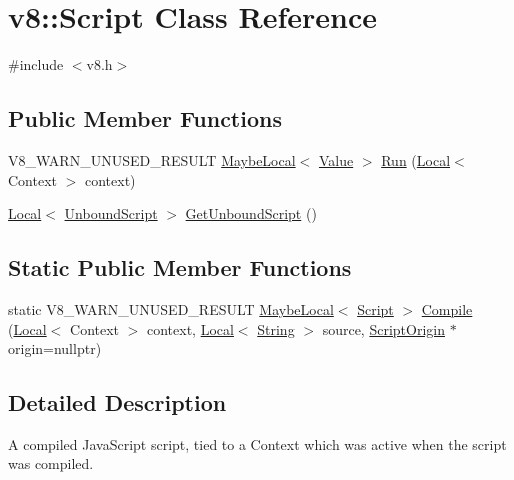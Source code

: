 \hypertarget{classv8_1_1Script}{}\section{v8\+:\+:Script Class Reference}
\label{classv8_1_1Script}


{\ttfamily \#include $<$v8.\+h$>$}

\subsection*{Public Member Functions}
\begin{DoxyCompactItemize}
\item 
V8\+\_\+\+W\+A\+R\+N\+\_\+\+U\+N\+U\+S\+E\+D\+\_\+\+R\+E\+S\+U\+LT \mbox{\hyperlink{classv8_1_1MaybeLocal}{Maybe\+Local}}$<$ \mbox{\hyperlink{classv8_1_1Value}{Value}} $>$ \mbox{\hyperlink{classv8_1_1Script_a73a556400c5f6a2a1460a933a815fbf9}{Run}} (\mbox{\hyperlink{classv8_1_1Local}{Local}}$<$ Context $>$ context)
\item 
\mbox{\hyperlink{classv8_1_1Local}{Local}}$<$ \mbox{\hyperlink{classv8_1_1UnboundScript}{Unbound\+Script}} $>$ \mbox{\hyperlink{classv8_1_1Script_a7f34b85c7687d933284e93e6e2593c14}{Get\+Unbound\+Script}} ()
\end{DoxyCompactItemize}
\subsection*{Static Public Member Functions}
\begin{DoxyCompactItemize}
\item 
static V8\+\_\+\+W\+A\+R\+N\+\_\+\+U\+N\+U\+S\+E\+D\+\_\+\+R\+E\+S\+U\+LT \mbox{\hyperlink{classv8_1_1MaybeLocal}{Maybe\+Local}}$<$ \mbox{\hyperlink{classv8_1_1Script}{Script}} $>$ \mbox{\hyperlink{classv8_1_1Script_acf5759f7f53b2a0eb57e835b32108452}{Compile}} (\mbox{\hyperlink{classv8_1_1Local}{Local}}$<$ Context $>$ context, \mbox{\hyperlink{classv8_1_1Local}{Local}}$<$ \mbox{\hyperlink{classv8_1_1String}{String}} $>$ source, \mbox{\hyperlink{classv8_1_1ScriptOrigin}{Script\+Origin}} $\ast$origin=nullptr)
\end{DoxyCompactItemize}


\subsection{Detailed Description}
A compiled Java\+Script script, tied to a Context which was active when the script was compiled. 

